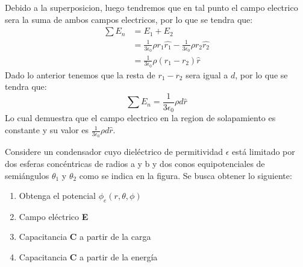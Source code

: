 \documentclass[
  11pt,
  letterpaper,
   addpoints,
   answers
  ]{exam}
\begin{document}
\begin{questions}
\begin{solution}
\begin{enumerate}
\begin{center}
\begin{tikzpicture}
            \end{tikzpicture}     
        \end{center}       
            Debido a la superposicion, luego tendremos que en tal punto el campo electrico sera la suma de ambos campos electricos, por lo que se tendra que:
            \begin{align}
                \sum E_{n} &= E_{1} + E_{2}\\
                           &= \frac{1}{3\epsilon_{0}} \rho r_{1} \hat{r_{1}} - \frac{1}{3\epsilon_{0}} \rho r_{2} \hat{r_{2}}\\
                           &= \frac{1}{3\epsilon_{0}} \rho (r_{1} - r_{2}) \hat{r}
            \end{align}
            Dado lo anterior tenemos que la resta de  \( r_{1} - r_{2} \) sera igual a \( d \), por lo que se tendra que:
            \begin{equation}
                \sum E_{n} = \frac{1}{3\epsilon_{0}} \rho d \hat{r}
            \end{equation}
            Lo cual demuestra que el campo electrico en la region de solapamiento es constante y su valor es \( \frac{1}{3\epsilon_{0}} \rho d \hat{r} \).
        \end{enumerate}
    \end{solution}
    \question  Considere un condensador cuyo dieléctrico de permitividad $\epsilon$ está limitado por dos esferas concéntricas de radios a y b y dos conos equipotenciales de semiángulos $\theta_{1}$ y $\theta_{2}$ como se indica en la figura. Se busca obtener lo siguiente:
    \begin{enumerate}
        \item Obtenga el potencial $\phi_{e}(r,\theta,\phi)$ 
        \item Campo eléctrico \textbf{E}
        \item Capacitancia \textbf{C} a partir de la carga 
        \item Capacitancia \textbf{C} a partir de la energía 
    \end{enumerate}
    \begin{center}
\end{center}
\end{questions}
\end{document}
